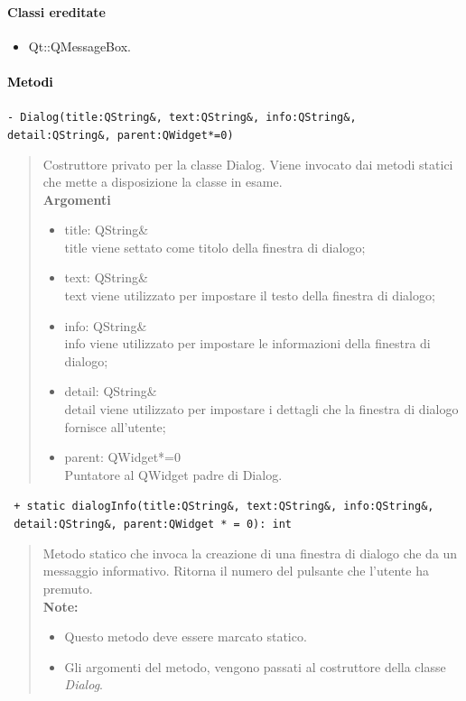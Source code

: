\paragraph{Classi ereditate\\}
\begin{itemize}
\item Qt::QMessageBox.
\end{itemize}
\paragraph{\textcolor{black}{Metodi\\}}
\color{blue}\verb!- Dialog(title:QString&, text:QString&, info:QString&, detail:QString&, parent:QWidget*=0)!
\begin{quote}
\color{black}Costruttore privato per la classe Dialog. Viene invocato dai metodi statici che mette a disposizione la classe in esame. \\
\textbf{Argomenti}
\begin{itemize}
\item title: QString\& \\ title viene settato come titolo della finestra di dialogo;
\item text: QString\& \\ text viene utilizzato per impostare il testo della finestra di dialogo;
\item info: QString\& \\ info viene utilizzato per impostare le informazioni della finestra di dialogo;
\item detail: QString\& \\ detail viene utilizzato per impostare i dettagli che la finestra di dialogo fornisce all'utente;
\item parent: QWidget*=0  \\ Puntatore al QWidget padre di Dialog.
\end{itemize}
\end{quote}
\color{blue}\verb! + static dialogInfo(title:QString&, text:QString&, info:QString&,! \\ \verb! detail:QString&, parent:QWidget * = 0): int!
\color{black}
\begin{quote}
Metodo statico che invoca la creazione di una finestra di dialogo che da un messaggio informativo. Ritorna il numero del pulsante che l'utente ha premuto. \\
\textbf{Note:}
\begin{itemize}
\item Questo metodo deve essere marcato statico.
\item Gli argomenti del metodo, vengono passati al costruttore della classe \emph{Dialog}.
\end{itemize}
\end{quote}

